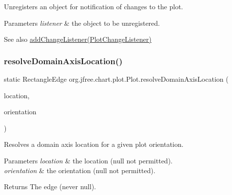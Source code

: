 Unregisters an object for notification of changes to the plot.


\begin{DoxyParams}{Parameters}
{\em listener} & the object to be unregistered.\\
\hline
\end{DoxyParams}
\begin{DoxySeeAlso}{See also}
\mbox{\hyperlink{classorg_1_1jfree_1_1chart_1_1plot_1_1_plot_af45cb36f24e3ef3650fcbf387c29e7cc}{add\+Change\+Listener(\+Plot\+Change\+Listener)}} 
\end{DoxySeeAlso}
\mbox{\label{classorg_1_1jfree_1_1chart_1_1plot_1_1_plot_a3bb144b028e0b183923086491f0e4617}} 
\subsubsection{\texorpdfstring{resolve\+Domain\+Axis\+Location()}{resolveDomainAxisLocation()}}
{\footnotesize\ttfamily static Rectangle\+Edge org.\+jfree.\+chart.\+plot.\+Plot.\+resolve\+Domain\+Axis\+Location (\begin{DoxyParamCaption}\item[{\mbox{\hyperlink{classorg_1_1jfree_1_1chart_1_1axis_1_1_axis_location}{Axis\+Location}}}]{location,  }\item[{\mbox{\hyperlink{classorg_1_1jfree_1_1chart_1_1plot_1_1_plot_orientation}{Plot\+Orientation}}}]{orientation }\end{DoxyParamCaption})\hspace{0.3cm}{\ttfamily [static]}}

Resolves a domain axis location for a given plot orientation.


\begin{DoxyParams}{Parameters}
{\em location} & the location ({\ttfamily null} not permitted). \\
\hline
{\em orientation} & the orientation ({\ttfamily null} not permitted).\\
\hline
\end{DoxyParams}
\begin{DoxyReturn}{Returns}
The edge (never {\ttfamily null}). 
\end{DoxyReturn}
\mbox{\label{classorg_1_1jfree_1_1chart_1_1plot_1_1_plot_a13690293d7d15b8fdad8c230b87e5da1}} 
